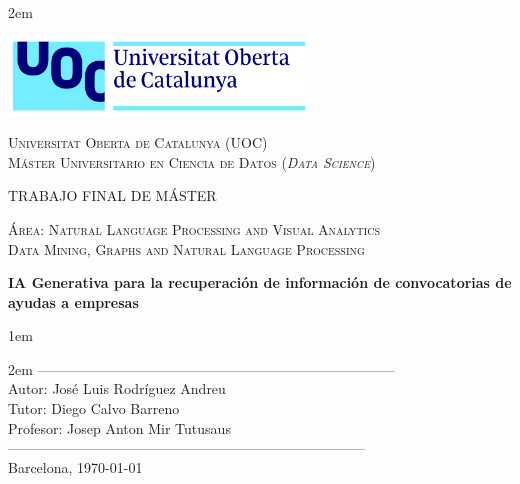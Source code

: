 \newpage
\thispagestyle{empty}

\baselineskip 2em


\centerline{\includegraphics[width=0.6\textwidth]{images/UOC-logo}}
\begin{center}
\textsc{Universitat Oberta de Catalunya (UOC) \\
Máster Universitario en Ciencia de Datos (\textit{Data Science})\\}


\vspace*{1.5cm}

\textsc{\Large TRABAJO FINAL DE MÁSTER}

\vspace*{0.5cm}

\textsc{\large Área: Natural Language Processing and Visual Analytics\\}
\textsc{\large Data Mining, Graphs and Natural Language Processing}


\vspace*{2.0cm}

\textbf{\Large IA Generativa para la recuperación de información de convocatorias de ayudas a empresas}


\vspace{2.5cm}
\baselineskip 1em

\baselineskip 2em
-----------------------------------------------------------------------------\\
Autor:      José Luis Rodríguez Andreu\\
Tutor:      Diego Calvo Barreno\\
Profesor:   Josep Anton Mir Tutusaus\\
-----------------------------------------------------------------------------\\
\vspace*{1.5cm}
Barcelona, \today

\end{center}

\newpage
\pagestyle{empty}
\hfill
